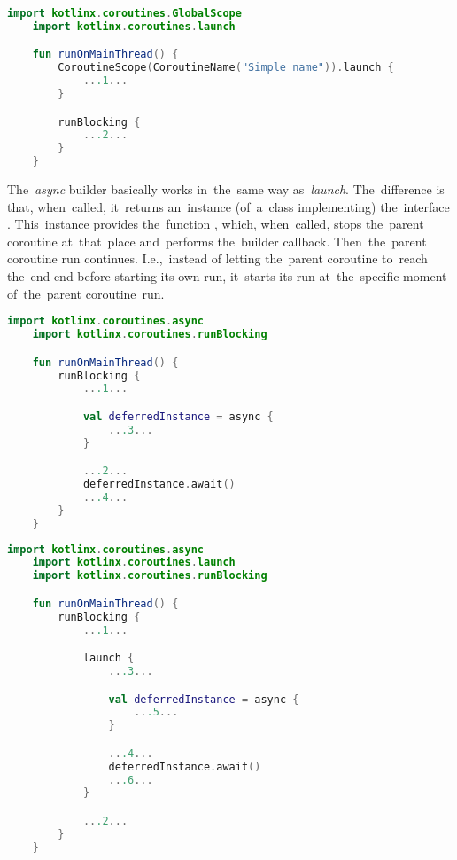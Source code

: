 \begin{lstlisting}[language=Kotlin, title={Numbers represent the~order of~execution}]
    import kotlinx.coroutines.GlobalScope
    import kotlinx.coroutines.launch

    fun runOnMainThread() {
        CoroutineScope(CoroutineName("Simple name")).launch {
            ...1...
        }

        runBlocking {
            ...2...
        }
    }
\end{lstlisting}

\label{kotlincoroutineasync}
\mbox{The \textit{async}} builder basically works in~the~same way \mbox{as \textit{launch}}.
The~difference is that, when~called, it~returns an~instance (of~a~class implementing) the~interface .
This~instance provides the~function , which, when~called, stops the~parent coroutine at~that~place and~performs the~builder callback.
Then~the~parent coroutine run continues.
I.e.,~instead of letting the~parent coroutine to~reach the~end end before starting its own run, it~starts its run at~the~specific moment of~the~parent coroutine~run.

\begin{lstlisting}[language=Kotlin, title={Numbers represent the~order of~execution}]
    import kotlinx.coroutines.async
    import kotlinx.coroutines.runBlocking

    fun runOnMainThread() {
        runBlocking {
            ...1...

            val deferredInstance = async {
                ...3...
            }

            ...2...
            deferredInstance.await()
            ...4...
        }
    }
\end{lstlisting}

\begin{lstlisting}[language=Kotlin, title={Numbers represent the~order of~execution}]
    import kotlinx.coroutines.async
    import kotlinx.coroutines.launch
    import kotlinx.coroutines.runBlocking

    fun runOnMainThread() {
        runBlocking {
            ...1...

            launch {
                ...3...

                val deferredInstance = async {
                    ...5...
                }

                ...4...
                deferredInstance.await()
                ...6...
            }

            ...2...
        }
    }
\end{lstlisting}

